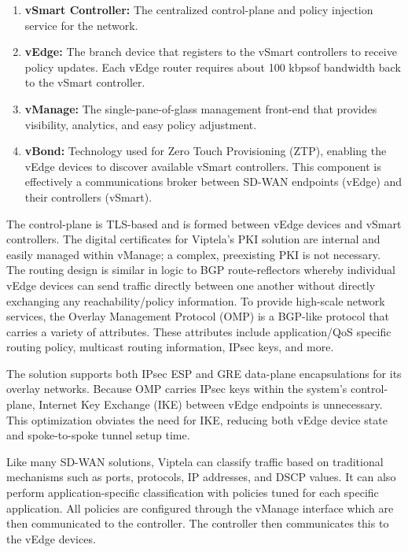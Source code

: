 \begin{enumerate}
  \item \textbf{vSmart Controller:} The centralized control-plane and policy
  injection service for the network.
  \item \textbf{vEdge:} The branch device that registers to the vSmart
  controllers to receive policy updates. Each vEdge router requires about 100
  kbpsof bandwidth back to the vSmart controller.
  \item \textbf{vManage:} The single-pane-of-glass management front-end that
  provides visibility, analytics, and easy policy adjustment.
  \item \textbf{vBond:} Technology used for Zero Touch Provisioning (ZTP),
  enabling the vEdge devices to discover available vSmart controllers. This
  component is effectively a communications broker between SD-WAN endpoints
  (vEdge) and their controllers (vSmart).
\end{enumerate}

The control-plane is TLS-based and is formed between vEdge devices and vSmart
controllers. The digital certificates for Viptela’s PKI solution are internal
and easily managed within vManage; a complex, preexisting PKI is not
necessary. The routing design is similar in logic to BGP route-reflectors
whereby individual vEdge devices can send traffic directly between one another
without directly exchanging any reachability/policy information. To provide
high-scale network services, the Overlay Management Protocol (OMP) is a
BGP-like protocol that carries a variety of attributes. These attributes
include application/QoS specific routing policy, multicast routing
information, IPsec keys, and more.

The solution supports both IPsec ESP and GRE data-plane encapsulations for its
overlay networks. Because OMP carries IPsec keys within the system’s
control-plane, Internet Key Exchange (IKE) between vEdge endpoints is
unnecessary. This optimization obviates the need for IKE, reducing both vEdge
device state and spoke-to-spoke tunnel setup time.

Like many SD-WAN solutions, Viptela can classify traffic based on traditional
mechanisms such as ports, protocols, IP addresses, and DSCP values. It can
also perform application-specific classification with policies tuned for each
specific application. All policies are configured through the vManage
interface which are then communicated to the controller. The controller then
communicates this to the vEdge devices.

